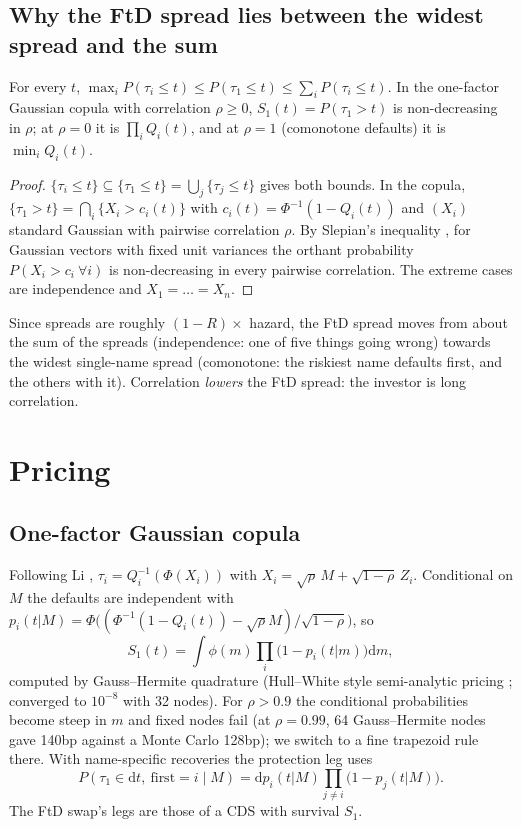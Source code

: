 \documentclass[11pt,a4paper]{article}
\begin{document}
\subsection{Why the FtD spread lies between the widest spread and the sum}
\begin{proposition}\label{prop:bounds}
For every $t$, $\max_i P(\tau_i\le t)\le P(\tau_1\le t)\le\sum_iP(\tau_i\le t)$. In the one-factor Gaussian
copula with correlation $\rho\ge0$, $S_1(t)=P(\tau_1>t)$ is non-decreasing in $\rho$; at $\rho=0$ it is
$\prod_iQ_i(t)$, and at $\rho=1$ (comonotone defaults) it is $\min_iQ_i(t)$.
\end{proposition}
\begin{proof}
$\{\tau_i\le t\}\subseteq\{\tau_1\le t\}=\bigcup_j\{\tau_j\le t\}$ gives both bounds. In the copula,
$\{\tau_1>t\}=\bigcap_i\{X_i>c_i(t)\}$ with $c_i(t)=\Phi^{-1}(1-Q_i(t))$ and $(X_i)$ standard Gaussian with
pairwise correlation $\rho$. By Slepian's inequality \cite{slepian1962}, for Gaussian vectors with fixed
unit variances the orthant probability $P(X_i>c_i\ \forall i)$ is non-decreasing in every pairwise
correlation. The extreme cases are independence and $X_1=\dots=X_n$.
\end{proof}
Since spreads are roughly $(1-R)\times$ hazard, the FtD spread moves from about the sum of the spreads
(independence: one of five things going wrong) towards the widest single-name spread (comonotone: the
riskiest name defaults first, and the others with it). Correlation \emph{lowers} the FtD spread: the investor
is long correlation.

\section{Pricing}
\subsection{One-factor Gaussian copula}
Following Li \cite{li2000}, $\tau_i=Q_i^{-1}(\Phi(X_i))$ with $X_i=\sqrt\rho\,M+\sqrt{1-\rho}\,Z_i$. Conditional on $M$
the defaults are independent with $p_i(t|M)=\Phi\big((\Phi^{-1}(1-Q_i(t))-\sqrt\rho M)/\sqrt{1-\rho}\big)$, so
\[
S_1(t)=\int\phi(m)\prod_i\big(1-p_i(t|m)\big)\mathrm dm,
\]
computed by Gauss--Hermite quadrature (Hull--White style semi-analytic pricing \cite{hw2004}; converged to
$10^{-8}$ with 32 nodes). For $\rho>0.9$ the conditional probabilities become steep in $m$ and fixed nodes fail
(at $\rho=0.99$, 64 Gauss--Hermite nodes gave 140bp against a Monte Carlo 128bp); we switch to a fine
trapezoid rule there. With name-specific recoveries the protection leg uses
\[P(\tau_1\in\mathrm dt,\ \text{first}=i\mid M)=\mathrm dp_i(t|M)\prod_{j\ne i}\big(1-p_j(t|M)\big).\]
The FtD swap's legs are those of a CDS with survival $S_1$.
\end{document}

